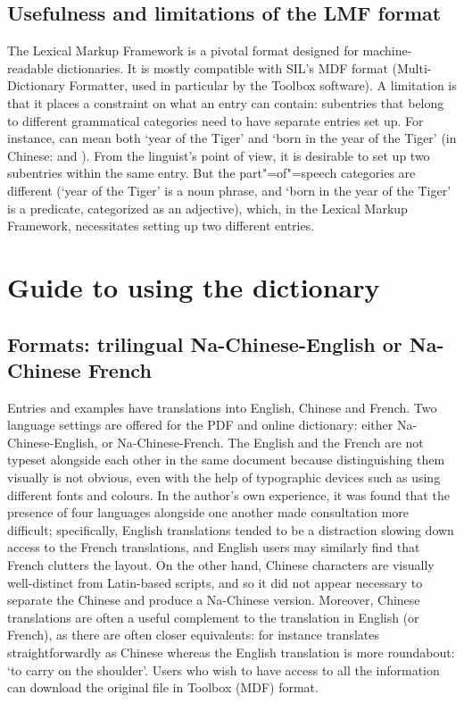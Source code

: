 	\subsection{Usefulness and limitations of the LMF format} \label{sec:lmf}

The Lexical Markup Framework \citep{francopoulo2013} is a pivotal format designed for machine-readable dictionaries. It is mostly compatible with SIL’s MDF format (Multi-Dictionary Formatter, used in particular by the Toolbox software). A limitation is that it places a constraint on what an entry can contain: subentries that belong to different grammatical categories need to have separate entries set up. For instance,  can mean both ‘year of the Tiger’ and ‘born in the year of the Tiger’ (in Chinese:  and ). From the linguist's point of view, it is desirable to set up two subentries within the same entry. But the part"=of"=speech categories are different (‘year of the Tiger’ is a noun phrase, and ‘born in the year of the Tiger’ is a predicate, categorized as an adjective), which, in the Lexical Markup Framework, necessitates setting up two different entries. 

\section{Guide to using the dictionary} \label{sec:howto}

	\subsection{Formats: trilingual Na-Chinese-English or Na-Chinese French} \label{sec:versions}

Entries and examples have translations into English, Chinese and French. Two language settings are offered for the PDF and online dictionary: either Na-Chinese-English, or Na-Chinese-French. The English and the French are not typeset alongside each other in the same document because distinguishing them visually is not obvious, even with the help of typographic devices such as using different fonts and colours. In the author's own experience, it was found that the presence of four languages alongside one another made consultation more difficult; specifically, English translations tended to be a distraction slowing down access to the French translations, and English users may similarly find that French clutters the layout. On the other hand, Chinese characters are visually well-distinct from Latin-based scripts, and so it did not appear necessary to separate the Chinese and produce a Na-Chinese version. Moreover, Chinese translations are often a useful complement to the translation in English (or French), as there are often closer equivalents: for instance  translates straightforwardly as Chinese  whereas the English translation is more roundabout: ‘to carry on the shoulder'. Users who wish to have access to all the information can download the original file in Toolbox (MDF) format. 

